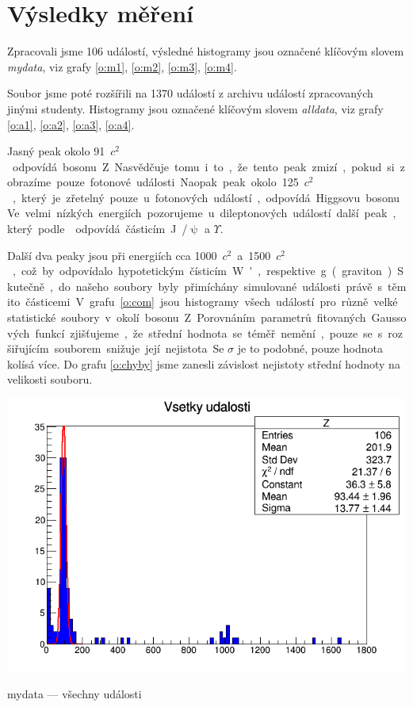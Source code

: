 \section*{Výsledky měření}
Zpracovali jsme 106 událostí, výsledné histogramy jsou označené klíčovým slovem \emph{mydata}, viz grafy \ref{o:m1}, \ref{o:m2}, \ref{o:m3}, \ref{o:m4}.

Soubor jsme poté rozšířili na 1370 událostí z archivu událostí zpracovaných jinými studenty. Histogramy jsou označené klíčovým slovem \emph{alldata}, viz grafy \ref{o:a1}, \ref{o:a2}, \ref{o:a3}, \ref{o:a4}.

Jasný peak okolo \SI{91}{\GeV\per $c^2$} odpovídá bosonu Z. Nasvědčuje tomu i to, že tento peak zmizí, pokud si zobrazíme pouze fotonové události.

Naopak peak okolo \SI{125}{\GeV\per $c^2$}, který je zřetelný pouze u fotonových událostí, odpovídá Higgsovu bosonu.

Ve velmi nízkých energiích pozorujeme u dileptonových událostí další peak, který podle \cite{skripta} odpovídá částicím J/$\uppsi$ a $\Upsilon$.

Další dva peaky jsou při energiích cca \SI{1000}{\GeV\per $c^2$} a \SI{1500}{\GeV\per $c^2$}, což by odpovídalo hypotetickým čísticím W', respektive g (graviton). Skutečně, do našeho soubory byly přimíchány simulované události právě s těmito částicemi.


V grafu \ref{o:com} jsou histogramy všech událostí pro různě velké statistické soubory v okolí bosonu Z.
Porovnáním parametrů fitovaných Gaussových funkcí zjišťujeme, že střední hodnota se téměř nemění, pouze se s rozšiřujícím souborem snižuje její nejistota. Se $\sigma$ je to podobné, pouze hodnota kolísá více. Do grafu \ref{o:chyby} jsme zanesli závislost nejistoty střední hodnoty na velikosti souboru.





\begin{graph}[htbp]
\centering
\includegraphics[width=\textwidth-2cm]{graficos/mydataz/c1_n9.png}
\caption{mydata --- všechny události}
\label{o:m1}
\end{graph}

